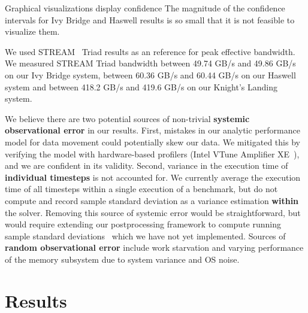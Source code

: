 \documentclass[10pt, conference, compsocconf]{IEEEtran}
\begin{document}
Graphical visualizations display confidence 
The magnitude of the confidence intervals for Ivy Bridge and Haswell results is
  so small that it is not feasible to visualize them.~\cite{benchmarking_cxx_code}

We used STREAM~\cite{stream} Triad results as an reference for peak effective
  bandwidth.
We measured STREAM Triad bandwidth between 49.74 GB/s and 49.86 GB/s on our Ivy
  Bridge system, between 60.36 GB/s and 60.44 GB/s on our Haswell system and
  between 418.2 GB/s and 419.6 GB/s on our Knight's Landing system.

We believe there are two potential sources of non-trivial \textbf{systemic
  observational error} in our results.
First, mistakes in our analytic performance model for data movement could
  potentially skew our data.
We mitigated this by verifying the model with hardware-based
  profilers (Intel VTune Amplifier XE~\cite{intel_vtune_amplifier}), and we are
  confident in its validity.
Second, variance in the execution time of \textbf{individual timesteps} is not
  accounted for.
We currently average the execution time of all timesteps
  within a single execution of a benchmark, but do not compute and record
  sample standard deviation as a variance estimation \textbf{within} the solver.
Removing this source of systemic error would be straightforward, but
  would require extending our postprocessing framework to compute running 
  sample standard deviations~\cite{benchmarking_cxx_code} which we have not
  yet implemented.
Sources of \textbf{random observational error} include work starvation and
  varying performance of the memory subsystem due to system variance and OS
  noise.

\section{Results}
\label{sec:results}
\end{document}
